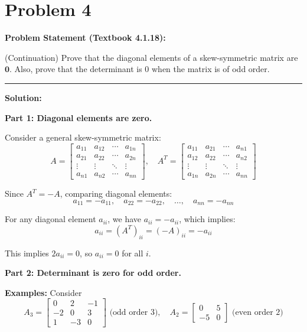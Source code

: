\clearpage
\section*{Problem 4}

\textbf{Problem Statement (Textbook 4.1.18):} 

(Continuation) Prove that the diagonal elements of a skew-symmetric matrix are $\mathbf{0}$. Also, prove that the determinant is $0$ when the matrix is of odd order.

\noindent\rule{\textwidth}{0.4pt}

\vspace{1em}

\textbf{Solution:}

\textbf{Part 1: Diagonal elements are zero.}

Consider a general skew-symmetric matrix:
$$A = \begin{bmatrix} 
a_{11} & a_{12} & \cdots & a_{1n} \\
a_{21} & a_{22} & \cdots & a_{2n} \\
\vdots & \vdots & \ddots & \vdots \\
a_{n1} & a_{n2} & \cdots & a_{nn}
\end{bmatrix}, \quad A^T = \begin{bmatrix} 
a_{11} & a_{21} & \cdots & a_{n1} \\
a_{12} & a_{22} & \cdots & a_{n2} \\
\vdots & \vdots & \ddots & \vdots \\
a_{1n} & a_{2n} & \cdots & a_{nn}
\end{bmatrix}$$

Since $A^T = -A$, comparing diagonal elements:
$$a_{11} = -a_{11}, \quad a_{22} = -a_{22}, \quad \ldots, \quad a_{nn} = -a_{nn}$$

For any diagonal element $a_{ii}$, we have $a_{ii} = -a_{ii}$, which implies:
$$a_{ii} = (A^T)_{ii} = (-A)_{ii} = -a_{ii}$$

This implies $2a_{ii} = 0$, so $a_{ii} = 0$ for all $i$.

\vspace{1em}

\textbf{Part 2: Determinant is zero for odd order.}

\textbf{Examples:} Consider
$$A_3 = \begin{bmatrix} 0 & 2 & -1 \\ -2 & 0 & 3 \\ 1 & -3 & 0 \end{bmatrix} \text{ (odd order 3)}, \quad A_2 = \begin{bmatrix} 0 & 5 \\ -5 & 0 \end{bmatrix} \text{ (even order 2)}$$


